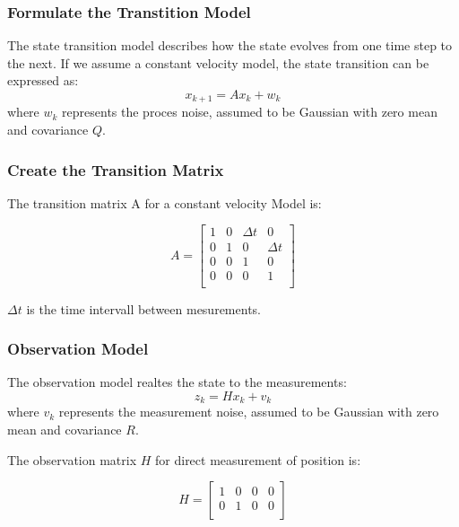 \documentclass{beamer}
\begin{document}
\begin{frame}
    \frametitle{Formulate the Transtition Model}
    The state transition model describes how the state evolves from one time step to the next. 
    If we assume a constant velocity model, the state transition can be expressed as:
    \begin{equation*}
        x_{k+1}=Ax_{k}+w_{k}
    \end{equation*}
    where \(w_{k}\) represents the proces noise, assumed to be Gaussian with zero mean and covariance \(Q\).
\end{frame}

\begin{frame}
    \frametitle{Create the Transition Matrix}
    The transition matrix A for a constant velocity Model is: 
    
    \begin{equation*}
        A = \begin{bmatrix}
            1 & 0 & \Delta t & 0        \\
            0 & 1 & 0        & \Delta t \\
            0 & 0 & 1        & 0        \\
            0 & 0 & 0        & 1        \\ 
        \end{bmatrix}
    \end{equation*}

    \(\Delta t\) is the time intervall between mesurements.
\end{frame}

\begin{frame}
    \frametitle{Observation Model}
    The observation model realtes the state to the measurements:
    \begin{equation*}
        z_{k}=Hx_{k}+v_{k}
    \end{equation*}
    where \(v_{k}\) represents the measurement noise, assumed to be Gaussian with zero mean and
    covariance \(R\).

    The observation matrix \(H\) for direct measurement of position is:
    
    \begin{equation*}
        H = \begin{bmatrix}
            1 & 0 & 0 & 0 \\
            0 & 1 & 0 & 0 \\
        \end{bmatrix}
    \end{equation*}

\end{frame}
\end{document}
